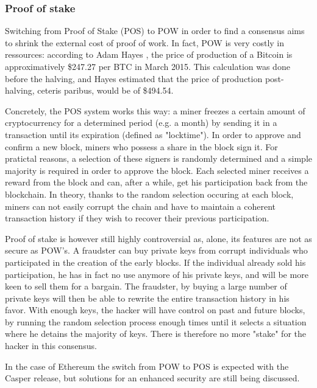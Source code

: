 \documentclass[11pt]{report}
\begin{document}
	\subsubsection*{Proof of stake}

Switching from Proof of Stake (POS) to POW in order to find a consensus aims to shrink the external cost of proof of work. In fact, POW is very costly in ressources: according to Adam Hayes \cite{HAYES}, the price of production of a Bitcoin is approximatively \$247.27 per BTC in March 2015. This calculation was done before the halving, and Hayes estimated that the price of production post-halving, ceteris paribus, would be of \$494.54. \newline

Concretely, the POS system works this way: a miner freezes a certain amount of cryptocurrency for a determined period (e.g. a month) by sending it in a transaction until its expiration (defined as "locktime"). In order to approve and confirm a new block, miners who possess a share in the block sign it. For pratictal reasons, a selection of these signers is randomly determined and a simple majority is required in order to approve the block. Each selected miner receives a reward from the block and can, after a while, get his participation back from the blockchain.\smallbreak
\clearpage
In theory, thanks to the random selection occuring at each block, miners can not easily corrupt the chain and have to maintain a coherent transaction history if they wish to recover their previous participation. 

\smallbreak
Proof of stake is however still highly controversial as, alone, its features are not as secure as POW's. \cite{BITFURY} A fraudster can buy private keys from corrupt individuals who participated in the creation of the early blocks. If the individual already sold his participation, he has in fact no use anymore of his private keys, and will be more keen to sell them for a bargain. The fraudster, by buying a large number of private keys will then be able to rewrite the entire transaction history in his favor. With enough keys, the hacker will have control on past and future blocks, by running the random selection process enough times until it selects a situation where he detains the majority of keys. There is therefore no more "stake" for the hacker in this consensus.

\smallbreak
In the case of Ethereum the switch from POW to POS is expected with the Casper release, but solutions for an enhanced security are still being discussed\cite{CASPER}.
\clearpage
\end{document}
